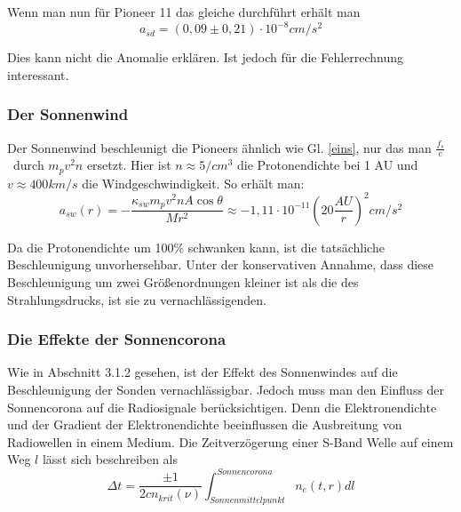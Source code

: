 Wenn man nun f\"ur Pioneer 11 das gleiche durchf\"uhrt erh\"alt man
\begin{equation}
a_{\mathit{sd}}=(0,09\pm 0,21)\cdot 10^{-8}\mathit{cm}/s^{2}
\end{equation}

Dies kann nicht die Anomalie erkl\"aren. Ist jedoch f\"ur die
Fehlerrechnung interessant.


\bigskip

\subsubsection{Der Sonnenwind}

Der Sonnenwind beschleunigt die Pioneers \"ahnlich wie Gl. \ref{eins}, nur das
man $\frac{f_{s}}{c}$ \ durch $m_{p}v^{2}n$ ersetzt. Hier ist
$n{\approx}5/\mathit{cm}^{3}$ die Protonendichte bei 1 AU und
$v{\approx}400\mathit{km}/s$ die Windgeschwindigkeit. So erh\"alt
man\cite{Anderson2002}:
\begin{equation}
a_{\mathit{sw}}(r)=-\frac{\kappa _{\mathit{sw}}m_{p}v^{2}nA\cos \theta
}{Mr^{2}}\approx -1,11\cdot
10^{-11}(20\frac{\mathit{AU}}{r})^{2}\mathit{cm}/s^{2}
\end{equation}

Da die Protonendichte um 100\% schwanken kann, ist die tats\"achliche
Beschleunigung unvorhersehbar. Unter der konservativen
Annahme, dass diese Beschleunigung um zwei Gr\"o{\ss}enordnungen
kleiner ist als die des Strahlungsdrucks, ist sie zu vernachl\"assigenden.


\bigskip

\subsubsection{Die Effekte der Sonnencorona}

Wie in Abschnitt 3.1.2 gesehen, ist der Effekt des Sonnenwindes auf die
Beschleunigung der Sonden vernachl\"assigbar. Jedoch muss man den
Einfluss der Sonnencorona auf die Radiosignale ber\"ucksichtigen. Denn
die Elektronendichte und der Gradient der Elektronendichte beeinflussen
die Ausbreitung von Radiowellen in einem Medium. Die Zeitverz\"ogerung einer S-Band Welle auf einem Weg $l$ l\"asst sich beschreiben als
\begin{equation}
\Delta t=\frac{\pm 1}{2\mathit{cn}_{\mathit{krit}}(\nu )}\int
_{\mathit{Sonnenmittelpunkt}}^{\mathit{Sonnencorona}}n_{e}(t,r)\mathit{dl}
\end{equation}
\cite{Anderson2002}

